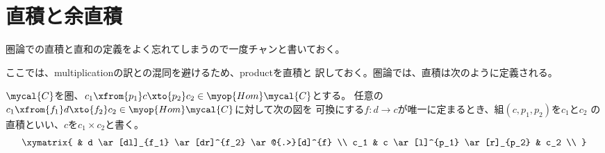 \begingroup %
	\newcommand{\Hom}{\ensuremath{\myop{Hom}}}
	\newcommand{\End}{\ensuremath{\myop{End}}}
	\newcommand{\onto}{\ensuremath{\myop{onto}}}
	\newcommand{\id}{\ensuremath{\myop{id}}}
\section{直積と余直積}\label{s1:直積と余直積} %
	圏論での直積と直和の定義をよく忘れてしまうので一度チャンと書いておく。

	ここでは、multiplicationの訳との混同を避けるため、productを直積と
	訳しておく。圏論では、直積は次のように定義される。

	\begin{definition}[直積（product）]\label{def:直積} %
		$\mycal{C}$を圏、$c_1\xfrom{p_1}c\xto{p_2}c_2\in\Hom\mycal{C}$とする。
		任意の$c_1\xfrom{f_1}d\xto{f_2}c_2\in\Hom\mycal{C}$に対して次の図を
		可換にする$f:d\to c$が唯一に定まるとき、組$(c,p_1,p_2)$を$c_1$と$c_2$
		の直積といい、$c$を$c_1\times c_2$と書く。
		\begin{equation*}\xymatrix{
			& d \ar[dl]_{f_1} \ar[dr]^{f_2} \ar@{.>}[d]^{f} \\
			c_1 & c \ar[l]^{p_1} \ar[r]_{p_2} & c_2 \\
		}\end{equation*}
	\end{definition} %

